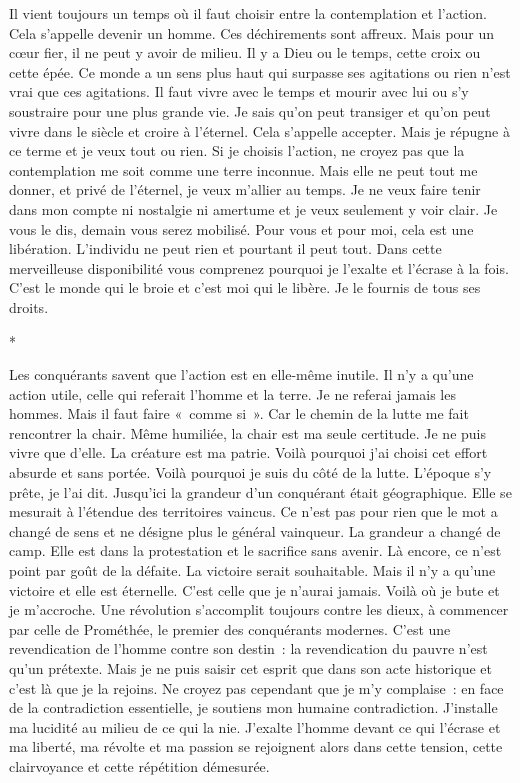 \documentclass{book}
\begin{document}
Il vient toujours un temps où il faut choisir entre la contemplation et l'action. Cela s'appelle devenir un homme. Ces déchirements sont affreux. Mais pour un cœur fier, il ne peut y avoir de milieu. Il y a Dieu ou le temps, cette croix ou cette épée. Ce monde a un sens plus haut qui surpasse ses agitations ou rien n'est vrai que ces agitations. Il faut vivre avec le temps et mourir avec lui ou s'y soustraire pour une plus grande vie. Je sais qu'on peut transiger et qu'on peut vivre dans le siècle et croire à l'éternel. Cela s'appelle accepter. Mais je répugne à ce terme et je veux tout ou rien. Si je choisis l'action, ne croyez pas que la contemplation me soit comme une terre inconnue. Mais elle ne peut tout me donner, et privé de l'éternel, je veux m'allier au temps. Je ne veux faire tenir dans mon compte ni nostalgie ni amertume et je veux seulement y voir clair. Je vous le dis, demain vous serez mobilisé. Pour vous et pour moi, cela est une libération. L'individu ne peut rien et pourtant il peut tout. Dans cette merveilleuse disponibilité vous comprenez pourquoi je l'exalte et l'écrase à la fois. C'est le monde qui le broie et c'est moi qui le libère. Je le fournis de tous ses droits.

\begin{center}
*
\end{center}

Les conquérants savent que l'action est en elle-même inutile. Il n'y a qu'une action utile, celle qui referait l'homme et la terre. Je ne referai jamais les hommes. Mais il faut faire « comme si ». Car le chemin de la lutte me fait rencontrer la chair. Même humiliée, la chair est ma seule certitude. Je ne puis vivre que d'elle. La créature est ma patrie. Voilà pourquoi j'ai choisi cet effort absurde et sans portée. Voilà pourquoi je suis du côté de la lutte. L'époque s'y prête, je l'ai dit. Jusqu'ici la grandeur d'un conquérant était géographique. Elle se mesurait à l'étendue des territoires vaincus. Ce n'est pas pour rien que le mot a changé de sens et ne désigne plus le général vainqueur. La grandeur a changé de camp. Elle est dans la protestation et le sacrifice sans avenir. Là encore, ce n'est point par goût de la défaite. La victoire serait souhaitable. Mais il n'y a qu'une victoire et elle est éternelle. C'est celle que je n'aurai jamais. Voilà où je bute et je m'accroche. Une révolution s'accomplit toujours contre les dieux, à commencer par celle de Prométhée, le premier des conquérants modernes. C'est une revendication de l'homme contre son destin : la revendication du pauvre n'est qu'un prétexte. Mais je ne puis saisir cet esprit que dans son acte historique et c'est là que je la rejoins. Ne croyez pas cependant que je m'y complaise : en face de la contradiction essentielle, je soutiens mon humaine contradiction. J'installe ma lucidité au milieu de ce qui la nie. J'exalte l'homme devant ce qui l'écrase et ma liberté, ma révolte et ma passion se rejoignent alors dans cette tension, cette clairvoyance et cette répétition démesurée.
\end{document}
